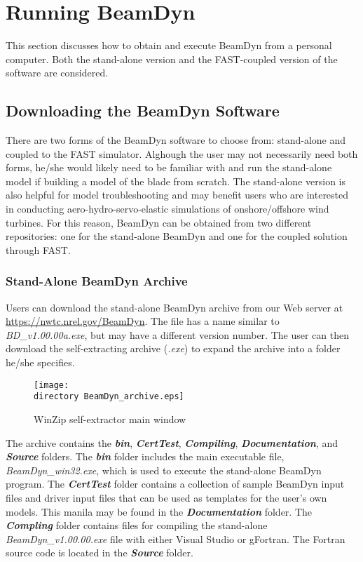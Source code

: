 \chapter{Running BeamDyn}
\label{sec:Run}
This section discusses how to obtain and execute BeamDyn from a personal computer. Both the stand-alone version and the FAST-coupled version of the software are considered.

\section{Downloading the BeamDyn Software}
There are two forms of the BeamDyn software to choose from: stand-alone and coupled to the FAST simulator. Alghough the user may not necessarily need both forms, he/she would likely need to be familiar with and run the stand-alone model if building a model of the blade from scratch. The stand-alone version is also helpful for model troubleshooting and may benefit users who are interested in conducting aero-hydro-servo-elastic simulations of onshore/offshore wind turbines. For this reason, BeamDyn can be obtained from two different repositories: one for the stand-alone BeamDyn and one for the coupled solution through FAST.

\subsection{Stand-Alone BeamDyn Archive}
Users can download the stand-alone BeamDyn archive from our Web server at \url{https://nwtc.nrel.gov/BeamDyn}. The file has a name similar to {\it BD\_v1.00.00a.exe}, but may have a different version number. The user can then download the self-extracting archive ({\it .exe}) to expand the archive into a folder he/she specifies.

\begin{figure}
    \centering
     \texttt{[image: \\directory BeamDyn\_archive.eps]}
     \caption{WinZip self-extractor main window}
     \label{fig:BDSelfExtractor}
\end{figure}

The archive contains the \textbf{\textit{bin}}, \textbf{\textit{CertTest}}, \textbf{\textit{Compiling}}, \textbf{\textit{Documentation}}, and \textbf{\textit{Source}} folders. The \textbf{\textit{bin}} folder includes the main executable file, \textit{BeamDyn\_win32.exe}, which is used to execute the stand-alone BeamDyn program. The \textbf{\textit{CertTest}} folder contains a collection of sample BeamDyn input files and driver input files that can be used as templates for the user's own models. This manila may be found in the \textbf{\textit{Documentation}} folder. The \textbf{\textit{Compling}} folder contains files for compiling the stand-alone \textit{BeamDyn\_v1.00.00.exe} file with either Visual Studio or gFortran. The Fortran source code is located in the \textbf{\textit{Source}} folder.

